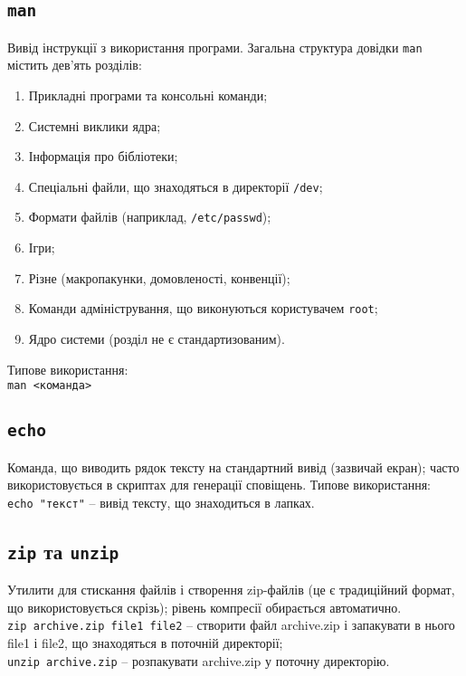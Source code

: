 \documentclass[10pt,a4paper]{fancyhandout}
\begin{document}
\subsection{\texttt{man}}
Вивід інструкції з використання програми. Загальна структура довідки \texttt{man} містить дев'ять розділів:
\begin{enumerate}
	\item Прикладні програми та консольні команди;
	\item Системні виклики ядра;
	\item Інформація про бібліотеки;
	\item Спеціальні файли, що знаходяться в директорії \texttt{/dev};
	\item Формати файлів (наприклад, \texttt{/etc/passwd});
	\item Ігри;
	\item Різне (макропакунки, домовленості, конвенції);
	\item Команди адміністрування, що виконуються користувачем \texttt{root};
	\item Ядро системи (розділ не є стандартизованим).
\end{enumerate}
Типове використання: \\
\texttt{man <команда>}
\goodbreak

\subsection{\texttt{echo}}
Команда, що виводить рядок тексту на стандартний вивід (зазвичай екран); часто використовується в скриптах для генерації сповіщень. Типове використання: \\
\texttt{echo "текст"} -- вивід тексту, що знаходиться в лапках.
\goodbreak

\subsection{\texttt{zip} та \texttt{unzip}}
Утилити для стискання файлів і створення zip-файлів (це є традиційний формат, що використовується скрізь); рівень компресії обирається автоматично.\\
\texttt{zip archive.zip file1 file2} -- створити файл archive.zip і запакувати в нього file1 і file2, що знаходяться в поточній директорії; \\
\texttt{unzip archive.zip} -- розпакувати archive.zip у поточну директорію.
\goodbreak
\end{document}
